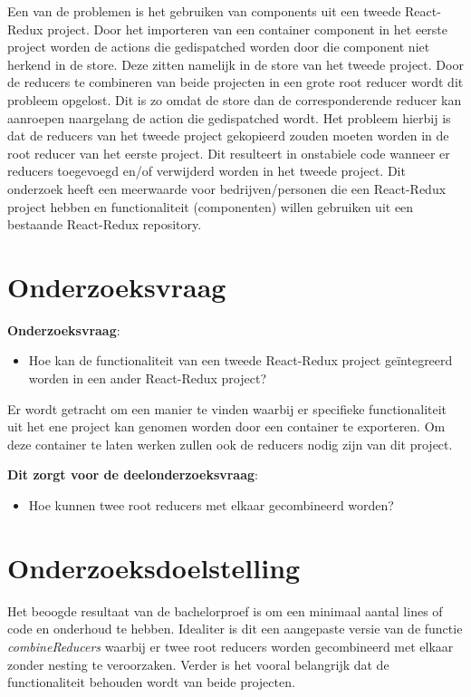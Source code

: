 Een van de problemen is het gebruiken van components uit een tweede React-Redux project. Door het importeren van een container component in het eerste project worden de actions die gedispatched worden door die component niet herkend in de store. Deze zitten namelijk in de store van het tweede project. Door de reducers te combineren van beide projecten in een grote root reducer wordt dit probleem opgelost. Dit is zo omdat de store dan de corresponderende reducer kan aanroepen naargelang de action die gedispatched wordt. Het probleem hierbij is dat de reducers van het tweede project gekopieerd zouden moeten worden in de root reducer van het eerste project. Dit resulteert in onstabiele code wanneer er reducers toegevoegd en/of verwijderd worden in het tweede project. Dit onderzoek heeft een meerwaarde voor bedrijven/personen die een React-Redux project hebben en functionaliteit (componenten) willen gebruiken uit een bestaande React-Redux repository. 


\section{Onderzoeksvraag}
\label{sec:onderzoeksvraag}

\textbf{Onderzoeksvraag}:
\begin{itemize}
	\item Hoe kan de functionaliteit van een tweede React-Redux project geïntegreerd worden in een ander React-Redux project?
\end{itemize}
Er wordt getracht om een manier te vinden waarbij er specifieke functionaliteit uit het ene project kan genomen worden door een container te exporteren. Om deze container te laten werken zullen ook de reducers nodig zijn van dit project. 

\textbf{Dit zorgt voor de deelonderzoeksvraag}:
\begin{itemize}
	\item Hoe kunnen twee root reducers met elkaar gecombineerd worden?
\end{itemize}

\section{Onderzoeksdoelstelling}
\label{sec:onderzoeksdoelstelling}
Het beoogde resultaat van de bachelorproef is om een minimaal aantal lines of code en onderhoud te hebben. Idealiter is dit een aangepaste versie van de functie \textit{combineReducers} waarbij er twee root reducers worden gecombineerd met elkaar zonder nesting te veroorzaken. Verder is het vooral belangrijk dat de functionaliteit behouden wordt van beide projecten.

